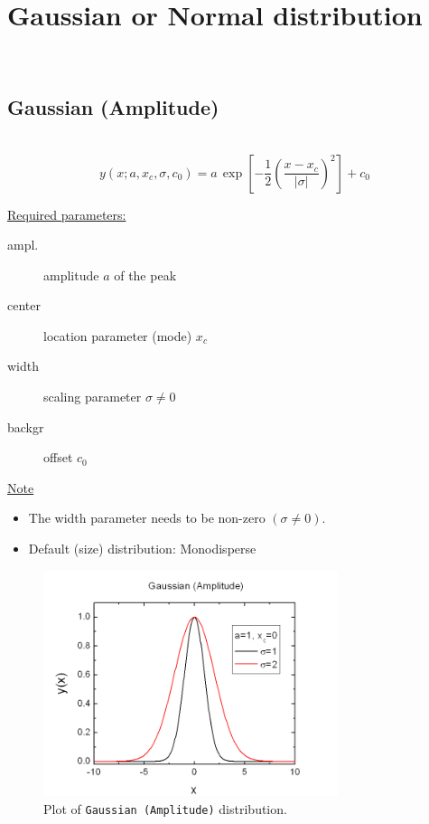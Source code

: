 \clearpage

\section{Gaussian or Normal distribution} ~\\
\label{sec:GaussianNormal}
\subsection{Gaussian (Amplitude)} \hspace{1pt} \\
\label{sec:GaussianNormalAmplitude}
\begin{equation}
y(x;a,x_c,\sigma,c_0) = a \,
\exp\left[-\frac{1}{2}\left(\frac{x-x_c}{|\sigma|}\right)^2\right]
+c_0
\end{equation}
\vspace{5mm}

\uline{Required parameters:}
\begin{description}
    \item[ampl.] amplitude $a$ of the peak
    \item[center] location parameter (mode) $x_c$
    \item[width] scaling parameter $\sigma\neq 0$
    \item[backgr] offset $c_0$
\end{description}

\uline{Note}
\begin{itemize}
  \item The width parameter needs to be non-zero $(\sigma\neq 0)$.
  \item Default (size) distribution: Monodisperse
\end{itemize}
\begin{figure}[htb]
\begin{center}
\includegraphics[width=0.768\textwidth]{GaussianAmplitude.png}
\end{center}
\caption{Plot of \texttt{Gaussian (Amplitude)} distribution.}
\label{fig:GaussianAmplitude}
\end{figure}

